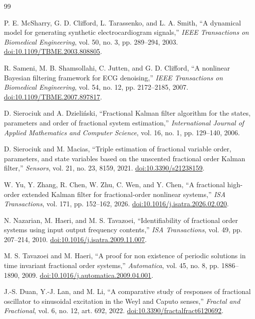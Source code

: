 \documentclass[11pt]{article}
\theoremstyle{definition}
\theoremstyle{remark}
\begin{document}
\begin{thebibliography}{99}
\small

P. E. McSharry, G. D. Clifford, L. Tarassenko, and L. A. Smith,
``A dynamical model for generating synthetic electrocardiogram signals,''
\emph{IEEE Transactions on Biomedical Engineering}, vol. 50, no. 3,
pp. 289--294, 2003.
\href{https://doi.org/10.1109/TBME.2003.808805}{doi:10.1109/TBME.2003.808805}.

R. Sameni, M. B. Shamsollahi, C. Jutten, and G. D. Clifford,
``A nonlinear Bayesian filtering framework for ECG denoising,''
\emph{IEEE Transactions on Biomedical Engineering}, vol. 54, no. 12,
pp. 2172--2185, 2007.
\href{https://doi.org/10.1109/TBME.2007.897817}{doi:10.1109/TBME.2007.897817}.

D. Sierociuk and A. Dzieli\'nski,
``Fractional Kalman filter algorithm for the states, parameters and order of
fractional system estimation,''
\emph{International Journal of Applied Mathematics and Computer Science},
vol. 16, no. 1, pp. 129--140, 2006.

D. Sierociuk and M. Macias,
``Triple estimation of fractional variable order, parameters, and state
variables based on the unscented fractional order Kalman filter,''
\emph{Sensors}, vol. 21, no. 23, 8159, 2021.
\href{https://doi.org/10.3390/s21238159}{doi:10.3390/s21238159}.

W. Yu, Y. Zhang, R. Chen, W. Zhu, C. Wen, and Y. Chen,
``A fractional high-order extended Kalman filter for fractional-order
nonlinear systems,'' \emph{ISA Transactions}, vol. 171, pp. 152--162, 2026.
\href{https://doi.org/10.1016/j.isatra.2026.02.020}{doi:10.1016/j.isatra.2026.02.020}.

N. Nazarian, M. Haeri, and M. S. Tavazoei,
``Identifiability of fractional order systems using input output frequency
contents,'' \emph{ISA Transactions}, vol. 49, pp. 207--214, 2010.
\href{https://doi.org/10.1016/j.isatra.2009.11.007}{doi:10.1016/j.isatra.2009.11.007}.

M. S. Tavazoei and M. Haeri,
``A proof for non existence of periodic solutions in time invariant
fractional order systems,'' \emph{Automatica}, vol. 45, no. 8,
pp. 1886--1890, 2009.
\href{https://doi.org/10.1016/j.automatica.2009.04.001}{doi:10.1016/j.automatica.2009.04.001}.

J.-S. Duan, Y.-J. Lan, and M. Li,
``A comparative study of responses of fractional oscillator to sinusoidal
excitation in the Weyl and Caputo senses,'' \emph{Fractal and Fractional},
vol. 6, no. 12, art. 692, 2022.
\href{https://doi.org/10.3390/fractalfract6120692}{doi:10.3390/fractalfract6120692}.


\end{thebibliography}
\end{document}
